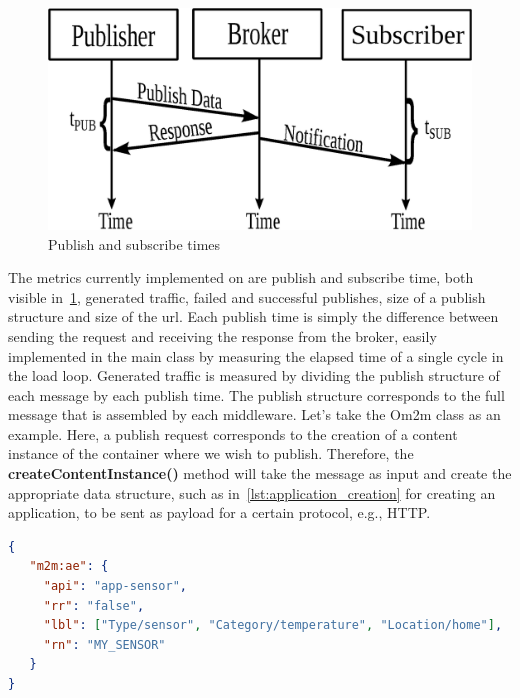 \documentclass[conference]{IEEEtran}
\begin{document}
\begin{figure}[htbp!]
  \centering
  \includegraphics[width=\linewidth]{figures/pub_sub_time.eps}
  \caption{Publish and subscribe times~\cite{cardoso_benchmarking_2017}}
  \label{fig:pub_sub_time}
\end{figure}

The metrics currently implemented on are publish and subscribe time, both visible in~\ref{fig:pub_sub_time}, generated traffic, failed and successful publishes, size of a publish structure and size of the url. Each publish time is simply the difference between sending the request and receiving the response from the broker, easily implemented in the main class by measuring the elapsed time of a single cycle in the load loop.
Generated traffic is measured by dividing the publish structure of each message by each publish time. The publish structure corresponds to the full message that is assembled by each middleware. Let's take the Om2m class as an example. Here, a publish request corresponds to the creation of a content instance of the container where we wish to publish. Therefore, the \textbf{createContentInstance()} method will take the message as input and create the appropriate data structure, such as in~\ref{lst:application_creation} for creating an application, to be sent as payload for a certain protocol, e.g., HTTP\@.

\begin{lstlisting}[linewidth=\columnwidth, caption=JSON payload for application creation, captionpos=b, label=lst:application_creation, language=json]
{
   "m2m:ae": {
     "api": "app-sensor",
     "rr": "false",
     "lbl": ["Type/sensor", "Category/temperature", "Location/home"],
     "rn": "MY_SENSOR"
   }
}
\end{lstlisting}
\end{document}
